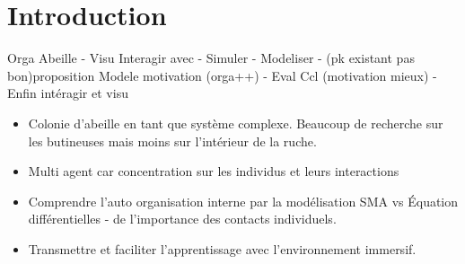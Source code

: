 \chapter*{Introduction}

Orga Abeille - Visu Interagir avec - Simuler - Modeliser - (pk existant pas bon)proposition Modele motivation (orga++) - Eval Ccl (motivation mieux) - Enfin intéragir et visu\\
\begin{itemize}
	\item Colonie d'abeille en tant que système complexe. Beaucoup de recherche sur les butineuses mais moins sur l'intérieur de la ruche.
	\item Multi agent car concentration sur les individus et leurs interactions
	\item Comprendre l'auto organisation interne par la modélisation SMA vs Équation différentielles - de l'importance des contacts individuels.	
	\item Transmettre et faciliter l'apprentissage avec l'environnement immersif.
\end{itemize}